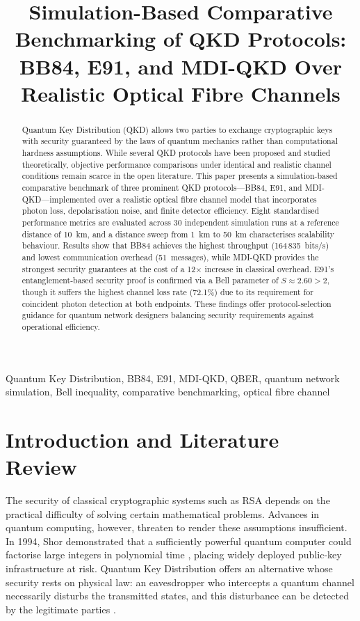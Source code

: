 \documentclass[conference]{IEEEtran}
\title{Simulation-Based Comparative Benchmarking of QKD Protocols:\\
BB84, E91, and MDI-QKD Over Realistic Optical Fibre Channels}
\author{
  \IEEEauthorblockN{[Author Name(s)]}
  \IEEEauthorblockA{
    [Department Name]\\
    [University Name]\\
    [City, Country]\\
    [email@university.edu]
  }
}
\begin{document}
\maketitle

\begin{abstract}
Quantum Key Distribution (QKD) allows two parties to exchange cryptographic
keys with security guaranteed by the laws of quantum mechanics rather than
computational hardness assumptions. While several QKD protocols have been
proposed and studied theoretically, objective performance comparisons under
identical and realistic channel conditions remain scarce in the open literature.
This paper presents a simulation-based comparative benchmark of three
prominent QKD protocols---BB84, E91, and MDI-QKD---implemented over a
realistic optical fibre channel model that incorporates photon loss,
depolarisation noise, and finite detector efficiency. Eight standardised
performance metrics are evaluated across 30 independent simulation runs at
a reference distance of 10~km, and a distance sweep from 1~km to 50~km
characterises scalability behaviour. Results show that BB84 achieves the
highest throughput (164\,835~bits/s) and lowest communication overhead
(51~messages), while MDI-QKD provides the strongest security guarantees at
the cost of a 12$\times$ increase in classical overhead. E91's
entanglement-based security proof is confirmed via a Bell parameter of
$S \approx 2.60 > 2$, though it suffers the highest channel loss rate
(72.1\%) due to its requirement for coincident photon detection at both
endpoints. These findings offer protocol-selection guidance for quantum
network designers balancing security requirements against operational
efficiency.
\end{abstract}

\begin{IEEEkeywords}
Quantum Key Distribution, BB84, E91, MDI-QKD, QBER, quantum network
simulation, Bell inequality, comparative benchmarking, optical fibre channel
\end{IEEEkeywords}

\section{Introduction and Literature Review}

The security of classical cryptographic systems such as RSA depends on the
practical difficulty of solving certain mathematical problems. Advances in
quantum computing, however, threaten to render these assumptions insufficient.
In 1994, Shor demonstrated that a sufficiently powerful quantum computer
could factorise large integers in polynomial time \cite{shor1994}, placing
widely deployed public-key infrastructure at risk. Quantum Key Distribution
offers an alternative whose security rests on physical law: an eavesdropper
who intercepts a quantum channel necessarily disturbs the transmitted states,
and this disturbance can be detected by the legitimate parties \cite{gisin2002}.
\end{document}
